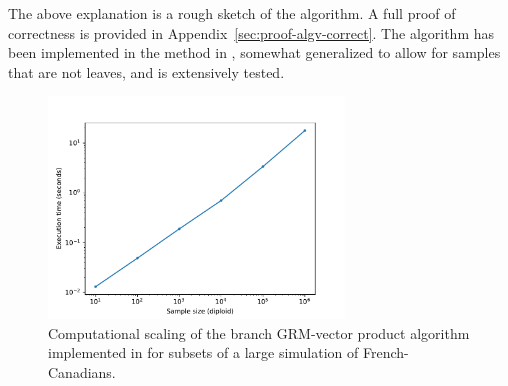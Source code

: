 The above explanation is a rough sketch of the algorithm.
A full proof of correctness is provided in Appendix~\ref{sec:proof-algv-correct}.
The algorithm has been implemented in the \tsGRMv{} %
method in \tskit{}, somewhat generalized to allow for samples that are not leaves,
and is extensively tested.



\begin{figure}
    \centering
    \includegraphics[width=0.7\textwidth]{Figures/matvec-benchmark}
    \caption{Computational scaling of the branch GRM-vector product algorithm
    implemented in \tskit{} for subsets of a large simulation 
    of French-Canadians.
    \label{fig:matvec-benchmark}}
\end{figure}

